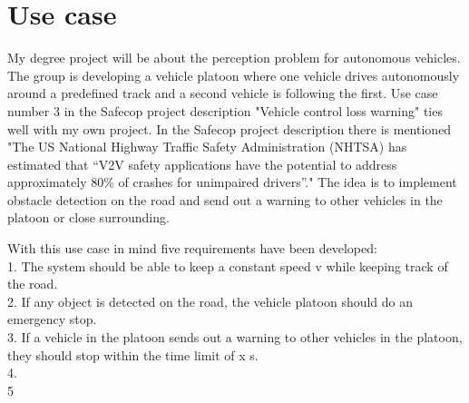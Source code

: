 \section{Use case}
My degree project will be about the perception problem for autonomous vehicles. The group is developing a vehicle platoon where one vehicle drives autonomously around a predefined track and a second vehicle is following the first. Use case number 3 in the Safecop project description "Vehicle control loss warning" ties well with my own project. In the Safecop project description there is mentioned "The US National Highway Traffic Safety Administration (NHTSA) has estimated that “V2V safety
applications have the potential to address approximately 80\% of crashes for unimpaired drivers”." The idea is to implement obstacle detection on the road and send out a warning to other vehicles in the platoon or close surrounding.

With this use case in mind five requirements have been developed:\\

1. The system should be able to keep a constant speed v while keeping track of the road.\\
2. If any object is detected on the road, the vehicle platoon should do an emergency stop.\\
3. If a vehicle in the platoon sends out a warning to other vehicles in the platoon, they should stop within the time limit of x s. \\
4. \\
5\\

